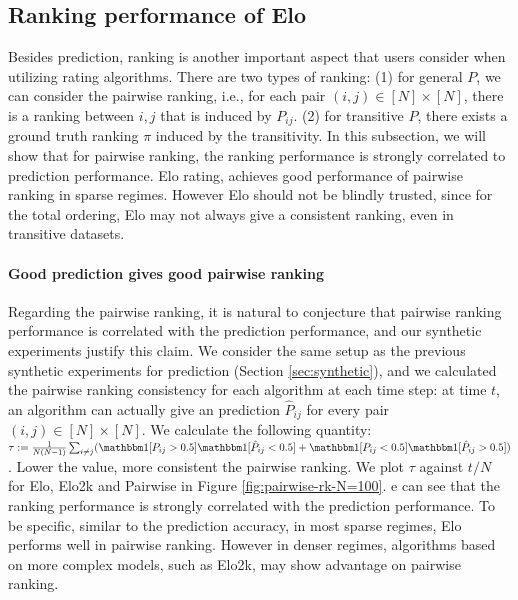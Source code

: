 \subsection{Ranking performance of Elo}
\label{sec:ranking}

Besides prediction, ranking is another important aspect that users consider when utilizing rating algorithms. There are two types of ranking: (1) for general $P$, we can consider the pairwise ranking, i.e., for each pair $(i,j) \in [N] \times [N]$, there is a ranking between $i,j$ that is induced by $P_{ij}$.
(2) for transitive $P$, there exists a ground truth ranking $\pi$ induced by the transitivity. 
In this subsection, we will show that for pairwise ranking, the ranking performance is strongly correlated to prediction performance. Elo rating, achieves good performance of pairwise ranking in sparse regimes. However Elo should not be blindly trusted, since for the total ordering, Elo may not always give a consistent ranking, even in transitive datasets.

\paragraph{Good prediction gives good pairwise ranking}
Regarding the pairwise ranking, it is natural to conjecture that pairwise ranking performance is correlated with the prediction performance, and our synthetic experiments justify this claim. We consider the same setup as the previous synthetic experiments for prediction (Section \ref{sec:synthetic}), and we calculated the pairwise ranking consistency for each algorithm at each time step:
at time $t$, an algorithm can actually give an prediction $\hat{P}_{ij}$ for every pair $(i,j) \in [N] \times [N]$. We calculate the following quantity: $\tau:=\frac{1}{N(N-1)}\sum_{i\neq j} (\one [P_{ij}>0.5] \one [\hat{P}_{ij}<0.5] + \one [P_{ij}<0.5] \one [\hat{P}_{ij}>0.5])$. Lower the value, more consistent the pairwise ranking. We plot $\tau$ against $t/N$ for Elo, Elo2k and Pairwise in Figure \ref{fig:pairwise-rk-N=100}. e can see that the ranking performance is strongly correlated with the prediction performance. To be specific, similar to the prediction accuracy, in most sparse regimes, Elo performs well in pairwise ranking. However in denser regimes, algorithms based on more complex models, such as Elo2k, may show advantage on pairwise ranking.


